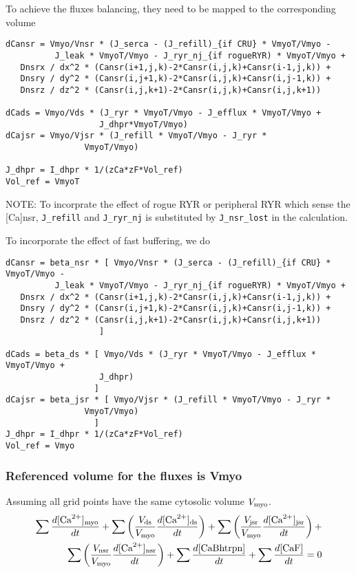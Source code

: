 To achieve the fluxes balancing, they need to be mapped to the corresponding
volume
\begin{verbatim}
dCansr = Vmyo/Vnsr * (J_serca - (J_refill)_{if CRU} * VmyoT/Vmyo - 
          J_leak * VmyoT/Vmyo - J_ryr_nj_{if rogueRYR) * VmyoT/Vmyo + 
   Dnsrx / dx^2 * (Cansr(i+1,j,k)-2*Cansr(i,j,k)+Cansr(i-1,j,k)) +
   Dnsry / dy^2 * (Cansr(i,j+1,k)-2*Cansr(i,j,k)+Cansr(i,j-1,k)) +
   Dnsrz / dz^2 * (Cansr(i,j,k+1)-2*Cansr(i,j,k)+Cansr(i,j,k+1)) 
   
dCads = Vmyo/Vds * (J_ryr * VmyoT/Vmyo - J_efflux * VmyoT/Vmyo +
                   J_dhpr*VmyoT/Vmyo) 
dCajsr = Vmyo/Vjsr * (J_refill * VmyoT/Vmyo - J_ryr *
                VmyoT/Vmyo)

J_dhpr = I_dhpr * 1/(zCa*zF*Vol_ref)
Vol_ref = VmyoT
\end{verbatim}
NOTE: To incorprate the effect of rogue RYR or peripheral RYR which sense the
[Ca]nsr, \verb!J_refill! and \verb!J_ryr_nj! is substituted by \verb!J_nsr_lost!
in the calculation.


To incorporate the effect of fast buffering, we do
\begin{verbatim}
dCansr = beta_nsr * [ Vmyo/Vnsr * (J_serca - (J_refill)_{if CRU} * VmyoT/Vmyo - 
          J_leak * VmyoT/Vmyo - J_ryr_nj_{if rogueRYR) * VmyoT/Vmyo + 
   Dnsrx / dx^2 * (Cansr(i+1,j,k)-2*Cansr(i,j,k)+Cansr(i-1,j,k)) +
   Dnsry / dy^2 * (Cansr(i,j+1,k)-2*Cansr(i,j,k)+Cansr(i,j-1,k)) +
   Dnsrz / dz^2 * (Cansr(i,j,k+1)-2*Cansr(i,j,k)+Cansr(i,j,k+1)) 
                   ]
                   
dCads = beta_ds * [ Vmyo/Vds * (J_ryr * VmyoT/Vmyo - J_efflux * VmyoT/Vmyo +
                   J_dhpr)
                  ] 
dCajsr = beta_jsr * [ Vmyo/Vjsr * (J_refill * VmyoT/Vmyo - J_ryr *
                VmyoT/Vmyo)
                  ]
J_dhpr = I_dhpr * 1/(zCa*zF*Vol_ref)
Vol_ref = Vmyo
\end{verbatim}



\subsubsection{Referenced volume for the fluxes is Vmyo}

Assuming all grid points have the same cytosolic volume $V_{\text{myo}}$.
\begin{equation*}
\begin{split}
 \sum \frac{d[{\text{Ca}^{2+}}]_{\text{myo}}}{dt} +  
   \sum\left(\frac{V_{\text{ds}}}{V_{\text{myo}}}\frac{d[{\text{Ca}^{2+}}]_{\text{ds}}}{dt}\right) + 
  \sum\left(\frac{V_{\text{jsr}}}{V_{\text{myo}}}\frac{d[{\text{Ca}^{2+}}]_{\text{jsr}}}{dt}\right) + \\
  \sum \left(\frac{V_{\text{nsr}}}{V_{\text{myo}}}\frac{d[{\text{Ca}^{2+}}]_{\text{nsr}}}{dt} \right)+ \sum
  \frac{d[{\text{CaBhtrpn}}]}{dt} + \sum \frac{d[\text{CaF}]}{dt} = 0
\end{split}
\end{equation*}

